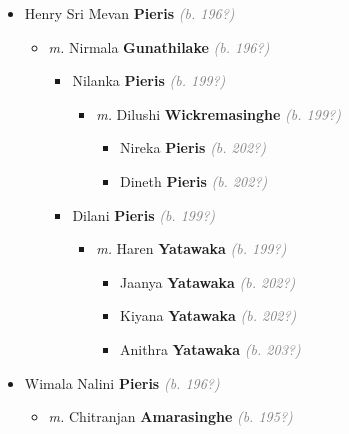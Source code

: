 \documentclass[10pt, openany]{book}
\begin{document}
\begin{itemize}
{\begin{itemize}
{\begin{itemize}
{\begin{itemize}
{  }
\item{Henry Sri Mevan \textbf{Pieris} \textcolor{gray}{\textit{(b. 196?)}}
\begin{itemize}
\item{\textit{m.} Nirmala \textbf{Gunathilake} \textcolor{gray}{\textit{(b. 196?)}}   \label{couple:00002060:00002061} \begin{itemize}
\item{Nilanka \textbf{Pieris} \textcolor{gray}{\textit{(b. 199?)}}
\begin{itemize}
\item{\textit{m.} Dilushi \textbf{Wickremasinghe} \textcolor{gray}{\textit{(b. 199?)}}   \label{couple:00002067:00002068} \begin{itemize}
\item{Nireka \textbf{Pieris} \textcolor{gray}{\textit{(b. 202?)}}
 }
\item{Dineth \textbf{Pieris} \textcolor{gray}{\textit{(b. 202?)}}
 }
\end{itemize}}
\end{itemize}
 }
\item{Dilani \textbf{Pieris} \textcolor{gray}{\textit{(b. 199?)}}
\begin{itemize}
\item{\textit{m.} Haren \textbf{Yatawaka} \textcolor{gray}{\textit{(b. 199?)}}   \label{couple:00002062:00002063} \begin{itemize}
\item{Jaanya \textbf{Yatawaka} \textcolor{gray}{\textit{(b. 202?)}}
 }
\item{Kiyana \textbf{Yatawaka} \textcolor{gray}{\textit{(b. 202?)}}
 }
\item{Anithra \textbf{Yatawaka} \textcolor{gray}{\textit{(b. 203?)}}
 }
\end{itemize}}
\end{itemize}
 }
\end{itemize}}
\end{itemize}
   }
\item{Wimala Nalini \textbf{Pieris} \textcolor{gray}{\textit{(b. 196?)}}
\begin{itemize}
\item{\textit{m.} Chitranjan \textbf{Amarasinghe} \textcolor{gray}{\textit{(b. 195?)}}   \label{couple:00002051:00002052} \begin{itemize}

\end{itemize}}
\end{itemize}}
\end{itemize}}
\end{itemize}}
\end{itemize}}
\end{itemize}
\end{document}
